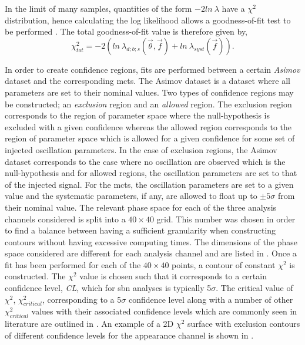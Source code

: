 In the limit of many samples, quantities of the form $-2ln~\lambda$ have a $\chi^2$ distribution, hence calculating the log likelihood allows a goodness-of-fit test to be performed \cite{introduction_to_mathematical_statistics_book}. The total goodness-of-fit value is therefore given by,
\begin{equation}
    \chi^2_{tot} = -2(ln~\lambda_{d;b;s}(\vec{\theta}, \vec{f}) + ln~\lambda_{syst}(\vec{f})).
\end{equation}

In order to create confidence regions, fits are performed between a certain \textit{Asimov} dataset and the corresponding \glspl{mct}. The Asimov dataset is a dataset where all parameters are set to their nominal values. Two types of confidence regions may be constructed; an \textit{exclusion} region and an \textit{allowed} region. The exclusion region corresponds to the region of parameter space where the null-hypothesis is excluded with a given confidence whereas the allowed region corresponds to the region of parameter space which is allowed for a given confidence for some set of injected oscillation parameters. In the case of exclusion regions, the Asimov dataset corresponds to the case where no oscillation are observed which is the null-hypothesis and for allowed regions, the oscillation parameters are set to that of the injected signal.  For the \glspl{mct}, the oscillation parameters are set to a given value and the systematic parameters, if any, are allowed to float up to $\pm5\sigma$ from their nominal value. The relevant phase space for each of the three analysis channels considered is split into a $40 \times 40$ grid. This number was chosen in order to find a balance between having a sufficient granularity when constructing contours without having excessive computing times. The dimensions of the phase space considered are different for each analysis channel and are listed in . Once a fit has been performed for each of the $40 \times 40$ points, a contour of constant $\chi^2$ is constructed. The $\chi^2$ value is chosen such that it corresponds to a certain confidence level, \textit{CL}, which for \gls{sbn} analyses is typically 5$\sigma$. The critical value of $\chi^2$, $\chi^2_{critical}$, corresponding to a 5$\sigma$ confidence level along with a number of other $\chi^2_{critical}$ values with their associated confidence levels which are commonly seen in literature are outlined in . An example of a 2D $\chi^2$ surface with exclusion contours of different confidence levels for the \nue appearance channel is shown in .

